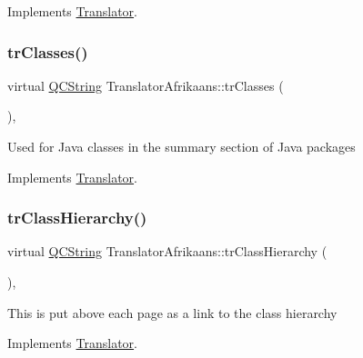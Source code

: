 Implements \mbox{\hyperlink{class_translator}{Translator}}.

\mbox{\label{class_translator_afrikaans_ae44b46dbc28ea967162d842f0f3a2a73}} 
\subsubsection{\texorpdfstring{trClasses()}{trClasses()}}
{\footnotesize\ttfamily virtual \mbox{\hyperlink{class_q_c_string}{Q\+C\+String}} Translator\+Afrikaans\+::tr\+Classes (\begin{DoxyParamCaption}{ }\end{DoxyParamCaption})\hspace{0.3cm}{\ttfamily [inline]}, {\ttfamily [virtual]}}

Used for Java classes in the summary section of Java packages 

Implements \mbox{\hyperlink{class_translator}{Translator}}.

\mbox{\label{class_translator_afrikaans_a6dfae5fd4df18c7d8ad9fb06c685d570}} 
\subsubsection{\texorpdfstring{trClassHierarchy()}{trClassHierarchy()}}
{\footnotesize\ttfamily virtual \mbox{\hyperlink{class_q_c_string}{Q\+C\+String}} Translator\+Afrikaans\+::tr\+Class\+Hierarchy (\begin{DoxyParamCaption}{ }\end{DoxyParamCaption})\hspace{0.3cm}{\ttfamily [inline]}, {\ttfamily [virtual]}}

This is put above each page as a link to the class hierarchy 

Implements \mbox{\hyperlink{class_translator}{Translator}}.

\mbox{\label{class_translator_afrikaans_a3c15ee5731054bd4b5782f6ecfacdb06}} 
